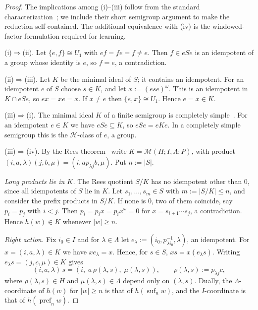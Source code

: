 \documentclass[11pt]{article}
\numberwithin{equation}{section}
\theoremstyle{plain}
\theoremstyle{definition}
\theoremstyle{remark}
\theoremstyle{plain}
\begin{document}
\begin{proof}
The implications among (i)--(iii) follow from the standard
characterization~\cite[Proposition~2.3]{AlmeidaEtAl2009};
we include their short semigroup argument to make the reduction
self-contained.  The additional equivalence with (iv) is the
windowed-factor formulation required for learning.

(i)$\Rightarrow$(ii).  Let $\{e,f\}\cong U_1$ with $ef=fe=f\ne e$.
Then $f\in eSe$ is an idempotent of a group whose identity is $e$, so
$f=e$, a contradiction.

(ii)$\Rightarrow$(iii).  Let $K$ be the minimal ideal of $S$; it
contains an idempotent.  For an idempotent $e$ of $S$ choose $s\in K$,
and let $x:=(ese)^\omega$.  This is an idempotent in $K\cap eSe$, so
$ex=xe=x$.  If $x\ne e$ then $\{e,x\}\cong U_1$.  Hence $e=x\in K$.

(iii)$\Rightarrow$(i).  The minimal ideal $K$ of a finite semigroup is
completely simple~\cite{Howie1995}.  For an idempotent $e\in K$ we have
$eSe\subseteq K$, so $eSe=eKe$.  In a completely simple semigroup this
is the $\mathcal H$-class of $e$, a group.

(iii)$\Rightarrow$(iv).  By the Rees theorem~\cite{Howie1995} write
$K=\mathcal M(H;I,\Lambda;P)$, with product
$(i,a,\lambda)(j,b,\mu)=(i,ap_{\lambda j}b,\mu)$.  Put $n:=|S|$.

\emph{Long products lie in $K$.}  The Rees quotient $S/K$ has no
idempotent other than $0$, since all idempotents of $S$ lie in $K$.
Let $s_1,\ldots,s_m\in S$ with $m:=|S/K|\le n$, and consider the prefix
products in $S/K$.  If none is $0$, two of them coincide, say
$p_i=p_j$ with $i<j$.  Then $p_i=p_ix=p_ix^\omega=0$ for
$x=s_{i+1}\cdots s_j$, a contradiction.  Hence $h(w)\in K$ whenever
$|w|\ge n$.

\emph{Right action.}  Fix $i_0\in I$ and for $\lambda\in\Lambda$ let
$e_\lambda:=(i_0,p_{\lambda i_0}^{-1},\lambda)$, an idempotent.  For
$x=(i,a,\lambda)\in K$ we have $xe_\lambda=x$.  Hence, for $s\in S$,
$xs=x(e_\lambda s)$.  Writing $e_\lambda s=(j,c,\mu)\in K$ gives
\[
 (i,a,\lambda)\,s=(i,\;a\,\rho(\lambda,s),\;\mu(\lambda,s)),
 \qquad \rho(\lambda,s):=p_{\lambda j}c,
\]
where $\rho(\lambda,s)\in H$ and $\mu(\lambda,s)\in\Lambda$ depend only
on $(\lambda,s)$.  Dually, the $\Lambda$-coordinate of $h(w)$ for
$|w|\ge n$ is that of $h(\operatorname{suf}_n w)$, and the
$I$-coordinate is that of $h(\operatorname{pref}_n w)$.


\end{proof}
\end{document}
